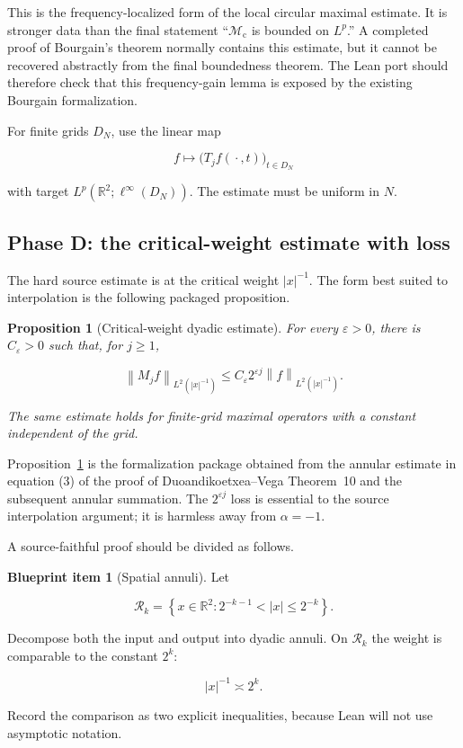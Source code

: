 \documentclass[11pt,a4paper]{article}
\newtheorem{proposition}[theorem]{Proposition}
\theoremstyle{definition}
\newtheorem{blueprint}[theorem]{Blueprint item}
\theoremstyle{remark}
\newcommand{\R}{\mathbb{R}}
\newcommand{\Mc}{\mathcal{M}_{\mathrm{c}}}
\newcommand{\norm}[1]{\left\lVert #1\right\rVert}
\newcommand{\abs}[1]{\left\lvert #1\right\rvert}
\begin{document}
This is the frequency-localized form of the local circular maximal estimate.
It is stronger data than the final statement ``$\Mc$ is bounded on $L^p$.''
A completed proof of Bourgain's theorem normally contains this estimate, but it
cannot be recovered abstractly from the final boundedness theorem.  The Lean
port should therefore check that this frequency-gain lemma is exposed by the
existing Bourgain formalization.

For finite grids $D_N$, use the linear map

\[
f\longmapsto \bigl(T_jf(\,\boldsymbol{\cdot}\,,t)\bigr)_{t\in D_N}
\]

with target $L^p(\R^2;\ell^\infty(D_N))$.  The estimate must be uniform in $N$.

\subsection{Phase D: the critical-weight estimate with loss}

The hard source estimate is at the critical weight $\abs{x}^{-1}$.  The form
best suited to interpolation is the following packaged proposition.

\begin{proposition}[Critical-weight dyadic estimate]\label{prop:critical-loss}
For every $\varepsilon>0$, there is $C_\varepsilon>0$ such that, for $j\geq1$,

\[
\norm{M_jf}_{L^2(\abs{x}^{-1})}
\leq C_\varepsilon 2^{\varepsilon j}
\norm{f}_{L^2(\abs{x}^{-1})}.
\]

The same estimate holds for finite-grid maximal operators with a constant
independent of the grid.
\end{proposition}

Proposition~\ref{prop:critical-loss} is the formalization package obtained from
the annular estimate in equation (3) of the proof of Duoandikoetxea--Vega
Theorem~10 and the subsequent annular summation.  The $2^{\varepsilon j}$ loss
is essential to the source interpolation argument; it is harmless away from
$\alpha=-1$.

A source-faithful proof should be divided as follows.

\begin{blueprint}[Spatial annuli]
Let

\[
\mathcal{R}_k=
\left\{x\in\R^2:2^{-k-1}<\abs{x}\leq2^{-k}\right\}.
\]

Decompose both the input and output into dyadic annuli.  On $\mathcal{R}_k$ the
weight is comparable to the constant $2^k$:

\[
\abs{x}^{-1}\asymp2^k.
\]

Record the comparison as two explicit inequalities, because Lean will not use
asymptotic notation.
\end{blueprint}
\end{document}
